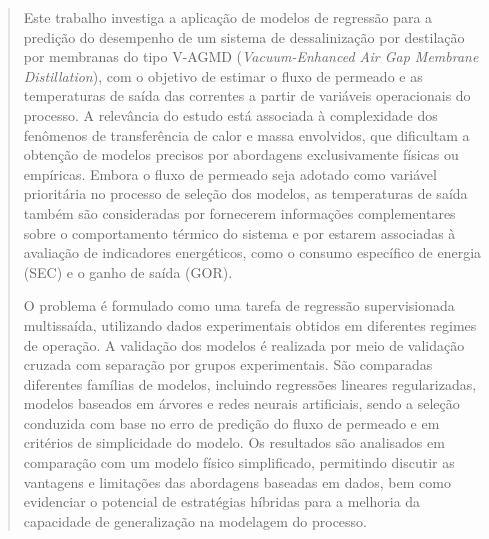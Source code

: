 \begin{abstract}

Este trabalho investiga a aplicação de modelos de regressão para a predição do desempenho de um sistema de dessalinização por destilação por membranas do tipo V-AGMD (\textit{Vacuum-Enhanced Air Gap Membrane Distillation}), com o objetivo de estimar o fluxo de permeado e as temperaturas de saída das correntes a partir de variáveis operacionais do processo. A relevância do estudo está associada à complexidade dos fenômenos de transferência de calor e massa envolvidos, que dificultam a obtenção de modelos precisos por abordagens exclusivamente físicas ou empíricas. Embora o fluxo de permeado seja adotado como variável prioritária no processo de seleção dos modelos, as temperaturas de saída também são consideradas por fornecerem informações complementares sobre o comportamento térmico do sistema e por estarem associadas à avaliação de indicadores energéticos, como o consumo específico de energia (SEC) e o ganho de saída (GOR).

O problema é formulado como uma tarefa de regressão supervisionada multissaída, utilizando dados experimentais obtidos em diferentes regimes de operação. A validação dos modelos é realizada por meio de validação cruzada com separação por grupos experimentais. São comparadas diferentes famílias de modelos, incluindo regressões lineares regularizadas, modelos baseados em árvores e redes neurais artificiais, sendo a seleção conduzida com base no erro de predição do fluxo de permeado e em critérios de simplicidade do modelo. Os resultados são analisados em comparação com um modelo físico simplificado, permitindo discutir as vantagens e limitações das abordagens baseadas em dados, bem como evidenciar o potencial de estratégias híbridas para a melhoria da capacidade de generalização na modelagem do processo.

\end{abstract}